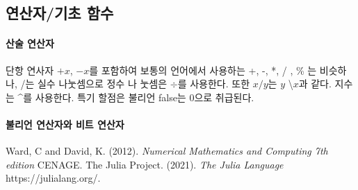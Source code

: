 \documentclass[a4paper, 11pt]{report}
\theoremstyle{definition}
\begin{document}
\subsection{연산자/기초 함수}

\paragraph{산술 연산자}
단항 연사자 $+x$, $-x$를 포함하여 보통의 언어에서 사용하는 +, -, *, / , \% 는 비슷하나, /는 실수 나눗셈으로 정수 나
눗셈은 $\div$를 사용한다. 또한 $x/y$는 $y$ \textbackslash $x$과 같다. 지수는 \^{}를 사용한다. 특기 할점은 불리언 false는 0으로 취급된다.
\paragraph{불리언 연산자와 비트 연산자}




\begin{thebibliography}{123456}
     Ward, C and David, K. (2012). \emph{Numerical Mathematics and Computing 7th edition} CENAGE.
     The Julia Project. (2021). \emph{The Julia Language} https://julialang.org/.
\end{thebibliography}
\end{document}
